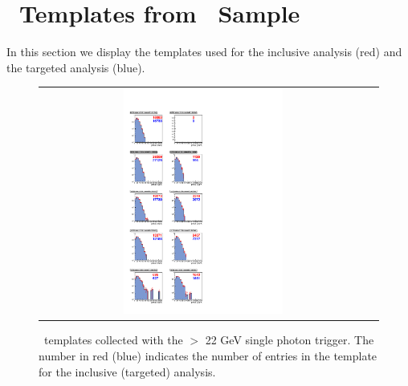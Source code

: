 \clearpage

\section{\MET\ Templates from \gjets\ Sample}
\label{app:templates}

In this section we display the templates used for the inclusive analysis (red) and the targeted analysis (blue).

\begin{figure}[!h]
\begin{center}
\begin{tabular}{cc}
\includegraphics[width=0.5\textwidth]{plots/template_targeted_0.pdf}
\end{tabular}
\caption{
\MET\ templates collected with the \pt $>$ 22 GeV single photon trigger.
The number in red (blue) indicates the number of entries in the template for the inclusive (targeted) analysis.
}
\end{center}
\end{figure}

\clearpage

